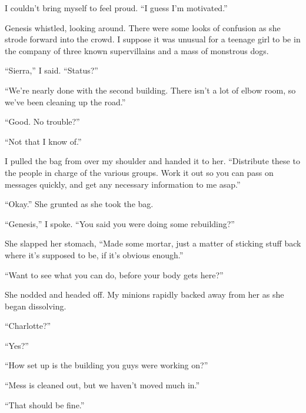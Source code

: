 I couldn't bring myself to feel proud.  ``I guess I'm motivated.''



Genesis whistled, looking around.  There were some looks of confusion as she strode forward into the crowd.  I suppose it was unusual for a teenage girl to be in the company of three known supervillains and a mass of monstrous dogs.



``Sierra,'' I said.  ``Status?''



``We're nearly done with the second building.  There isn't a lot of elbow room, so we've been cleaning up the road.''



``Good.  No trouble?''



``Not that I know of.''



I pulled the bag from over my shoulder and handed it to her.  ``Distribute these to the people in charge of the various groups.  Work it out so you can pass on messages quickly, and get any necessary information to me asap.''



``Okay.''  She grunted as she took the bag.



``Genesis,'' I spoke.  ``You said you were doing some rebuilding?''



She slapped her stomach, ``Made some mortar, just a matter of sticking stuff back where it's supposed to be, if it's obvious enough.''



``Want to see what you can do, before your body gets here?''



She nodded and headed off.  My minions rapidly backed away from her as she began dissolving.



``Charlotte?''



``Yes?''



``How set up is the building you guys were working on?''



``Mess is cleaned out, but we haven't moved much in.''



``That should be fine.''




